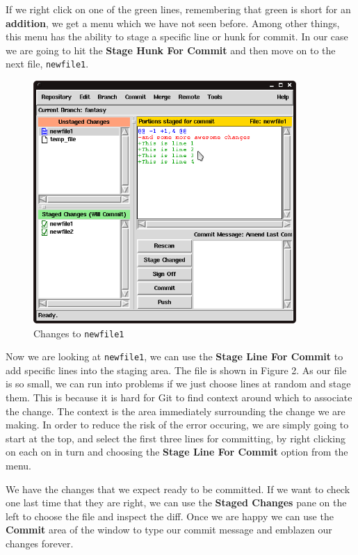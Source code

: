 If we right click on one of the green lines, remembering that green is short for an \textbf{addition}, we get a menu which we have not seen before.  Among other things, this menu has the ability to stage a specific line or hunk for commit.  In our case we are going to hit the \textbf{Stage Hunk For Commit} and then move on to the next file, \texttt{newfile1}.

\begin{figure}[hbt]
\centering
\includegraphics[width=10cm]{images/f-af5-d2.png}
\caption{Changes to \texttt{newfile1}}
\end{figure} 

Now we are looking at \texttt{newfile1}, we can use the \textbf{Stage Line For Commit} to add specific lines into the staging area.  The file is shown in Figure 2.  As our file is so small, we can run into problems if we just choose lines at random and stage them.  This is because it is hard for Git to find context around which to associate the change.  The context is the area immediately surrounding the change we are making.  In order to reduce the risk of the error occuring, we are simply going to start at the top, and select the first three lines for committing, by right clicking on each on in turn and choosing the \textbf{Stage Line For Commit} option from the menu.

We have the changes that we expect ready to be committed.  If we want to check one last time that they are right, we can use the \textbf{Staged Changes} pane on the left to choose the file and inspect the diff.  Once we are happy we can use the \textbf{Commit} area of the window to type our commit message and emblazen our changes forever.


